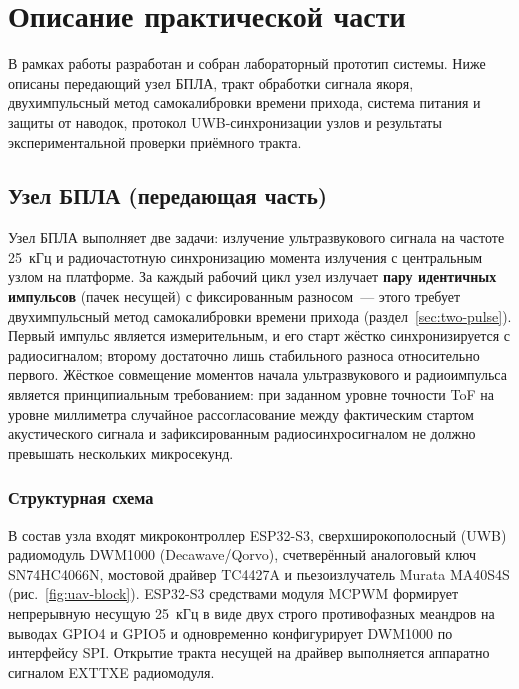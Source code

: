 \section{Описание практической части}
\label{sec:Chapter4}

В рамках работы разработан и собран лабораторный прототип системы. Ниже описаны
передающий узел БПЛА, тракт обработки сигнала якоря, двухимпульсный метод
самокалибровки времени прихода, система питания и защиты от наводок, протокол
UWB-синхронизации узлов и результаты экспериментальной проверки приёмного тракта.

\subsection{Узел БПЛА (передающая часть)}
\label{sec:uav-node}

Узел БПЛА выполняет две задачи: излучение ультразвукового сигнала на частоте 25~кГц
и радиочастотную синхронизацию момента излучения с центральным узлом на платформе.
За каждый рабочий цикл узел излучает \textbf{пару идентичных импульсов} (пачек несущей)
с фиксированным разносом~--- этого требует двухимпульсный метод самокалибровки времени
прихода (раздел~\ref{sec:two-pulse}). Первый импульс является измерительным, и его старт
жёстко синхронизируется с радиосигналом; второму достаточно лишь стабильного разноса
относительно первого. Жёсткое совмещение моментов начала ультразвукового и радиоимпульса
является принципиальным требованием: при заданном уровне точности ToF на уровне миллиметра
случайное рассогласование между фактическим стартом акустического сигнала и
зафиксированным радиосинхросигналом не должно превышать нескольких микросекунд.

\subsubsection{Структурная схема}

В состав узла входят микроконтроллер ESP32-S3, сверхширокополосный (UWB) радиомодуль
DWM1000 (Decawave/Qorvo), счетверённый аналоговый ключ SN74HC4066N, мостовой драйвер
TC4427A и пьезоизлучатель Murata MA40S4S (рис.~\ref{fig:uav-block}).
ESP32-S3 средствами модуля MCPWM формирует непрерывную несущую 25~кГц в виде двух
строго противофазных меандров на выводах GPIO4 и GPIO5 и одновременно конфигурирует
DWM1000 по интерфейсу SPI. Открытие тракта несущей на драйвер выполняется аппаратно
сигналом EXTTXE радиомодуля.

